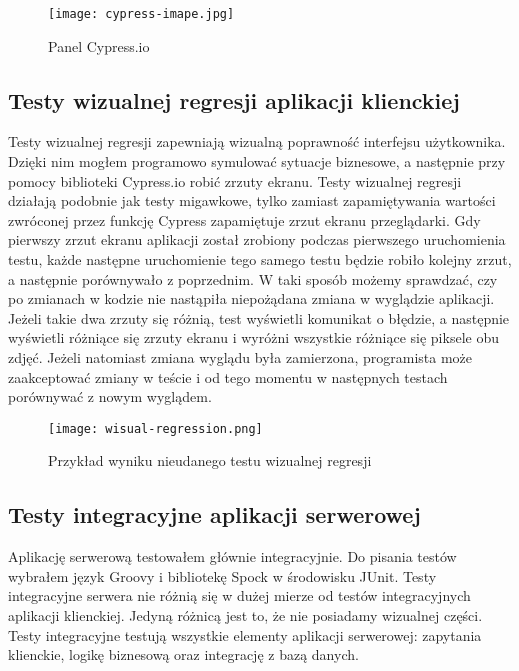 \begin{figure}
    \texttt{[image: cypress-imape.jpg]}
    \caption{Panel Cypress.io} \label{fig-cypress}
\end{figure}

\subsection{Testy wizualnej regresji aplikacji klienckiej}
Testy wizualnej regresji zapewniają wizualną poprawność interfejsu użytkownika. Dzięki nim mogłem programowo symulować sytuacje biznesowe, a następnie przy pomocy biblioteki Cypress.io robić zrzuty ekranu. Testy wizualnej regresji działają podobnie jak testy migawkowe, tylko zamiast zapamiętywania wartości zwróconej przez funkcję Cypress zapamiętuje zrzut ekranu przeglądarki. Gdy pierwszy zrzut ekranu aplikacji został zrobiony podczas pierwszego uruchomienia testu, każde następne uruchomienie tego samego testu będzie robiło kolejny zrzut, a następnie porównywało z poprzednim. W taki sposób możemy sprawdzać, czy po zmianach w kodzie nie nastąpiła niepożądana zmiana w wyglądzie aplikacji. Jeżeli takie dwa zrzuty się różnią, test wyświetli komunikat o błędzie, a następnie wyświetli różniące się zrzuty ekranu i wyróżni wszystkie różniące się piksele obu zdjęć. Jeżeli natomiast zmiana wyglądu była zamierzona, programista może zaakceptować zmiany w teście i od tego momentu w następnych testach porównywać z nowym wyglądem.

\begin{figure}
    \texttt{[image: wisual-regression.png]}
    \caption{Przykład wyniku nieudanego testu wizualnej regresji} \label{fig-cypress-vr}
\end{figure}


\subsection{Testy integracyjne aplikacji serwerowej}
Aplikację serwerową testowałem głównie integracyjnie. Do pisania testów wybrałem język Groovy i bibliotekę Spock w środowisku JUnit. Testy integracyjne serwera nie różnią się w dużej mierze od testów integracyjnych aplikacji klienckiej. Jedyną różnicą jest to, że nie posiadamy wizualnej części. Testy integracyjne testują wszystkie elementy aplikacji serwerowej: zapytania klienckie, logikę biznesową oraz integrację z bazą danych.

